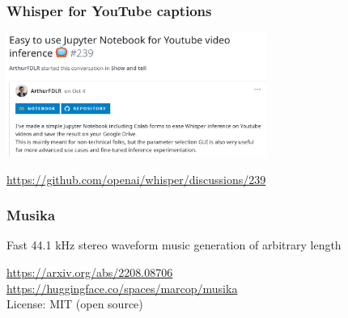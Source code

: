 \documentclass[17pt,aspectratio=169,hyperref={pdfusetitle,colorlinks,allcolors=olive}]{beamer}
\begin{document}
\begin{frame}[fragile]
  \frametitle{Whisper for YouTube captions}

  \includegraphics[width=8.5cm]{figs/whisper-youtube}

  \begin{flushright}
    {\scriptsize
    \url{https://github.com/openai/whisper/discussions/239}
  }
  \end{flushright}

\end{frame}


\begin{frame}[fragile]
  \frametitle{Musika}

  Fast 44.1 kHz stereo waveform music generation of arbitrary length

  \begin{flushright}
    \url{https://arxiv.org/abs/2208.08706} \\
    \url{https://huggingface.co/spaces/marcop/musika} \\
    License: MIT (open source) \\
  \end{flushright}

\end{frame}
\end{document}

